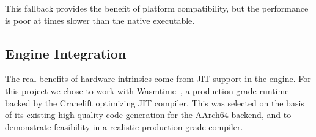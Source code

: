 This fallback provides the benefit of platform compatibility, but the
performance is poor at \MetricGenericWasmtimeBaselineDivNative times slower than
the native executable.


\subsection{Engine Integration}

The real benefits of hardware intrinsics come from JIT support in the \wasm
engine. For this project we chose to work with Wasmtime~\cite{wasmtime}, a
production-grade \wasm runtime backed by the Cranelift optimizing JIT compiler.
This was selected on the basis of its existing high-quality code generation for
the AArch64 backend, and to demonstrate feasibility in a realistic
production-grade compiler.

